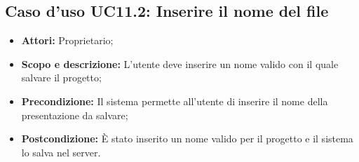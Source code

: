 \subsection{Caso d'uso UC11.2: Inserire il nome del file}
\begin{itemize}
	\item \textbf{Attori:} Proprietario;
	\item \textbf{Scopo e descrizione:} L'utente deve inserire un nome valido con il quale salvare il progetto;
	\item \textbf{Precondizione:} Il sistema permette all'utente di inserire il nome della presentazione da salvare;
	\item \textbf{Postcondizione:} È stato inserito un nome valido per il progetto e il sistema lo salva nel server.
\end{itemize}

